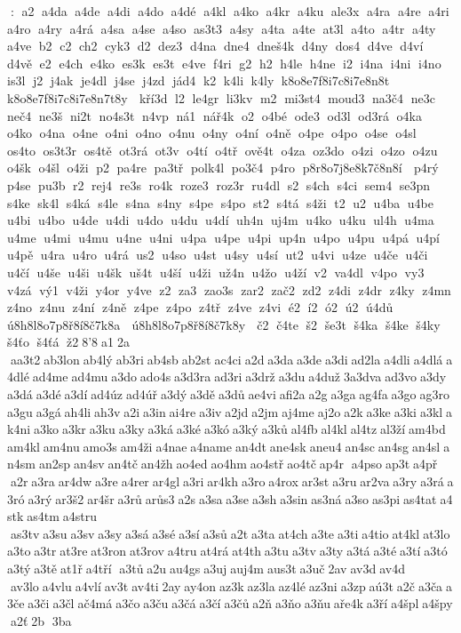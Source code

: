 :  a2  a4da  a4de  a4di  a4do  a4dé  a4kl  a4ko  a4kr  a4ku  ale3x  a4ra  a4re  a4ri  a4ro  a4ry  a4rá  a4sa  a4se  a4so  as3t3  a4sy  a4ta  a4te  at3l  a4to  a4tr  a4ty  a4ve  b2  c2  ch2  cyk3  d2  dez3  d4na  dne4  dneš4k  d4ny  dos4  d4ve  d4ví  d4vě  e2  e4ch  e4ko  es3k  es3t  e4ve  f4ri  g2  h2  h4le  h4ne  i2  i4na  i4ni  i4no  is3l  j2  j4ak  je4dl  j4se  j4zd  jád4  k2  k4li  k4ly  k8o8e7f8i7c8i7e8n8t   k8o8e7f8i7c8i7e8n7t8y   kří3d  l2  le4gr  li3kv  m2  mi3st4  moud3  na3č4  ne3c  neč4  ne3š  ni2t  no4s3t  n4vp  ná1  nář4k  o2  o4bé  ode3  od3l  od3rá  o4ka  o4ko  o4na  o4ne  o4ni  o4no  o4nu  o4ny  o4ní  o4ně  o4pe  o4po  o4se  o4sl  os4to  os3t3r  os4tě  ot3rá  ot3v  o4tí  o4tř  ově4t  o4za  oz3do  o4zi  o4zo  o4zu  o4šk  o4šl  o4ži  p2  pa4re  pa3tř  polk4l  po3č4  p4ro  p8r8o7j8e8k7č8n8í   p4rý  p4se  pu3b  r2  rej4  re3s  ro4k  roze3  roz3r  ru4dl  s2  s4ch  s4ci  sem4  se3pn  s4ke  sk4l  s4ká  s4le  s4na  s4ny  s4pe  s4po  st2  s4tá  s4ži  t2  u2  u4ba  u4be  u4bi  u4bo  u4de  u4di  u4do  u4du  u4dí  uh4n  uj4m  u4ko  u4ku  ul4h  u4ma  u4me  u4mi  u4mu  u4ne  u4ni  u4pa  u4pe  u4pi  up4n  u4po  u4pu  u4pá  u4pí  u4pě  u4ra  u4ro  u4rá  us2  u4so  u4st  u4sy  u4sí  ut2  u4vi  u4ze  u4če  u4či  u4čí  u4še  u4ši  u4šk  uš4t  u4ší  u4ži  už4n  u4žo  u4ží  v2  va4dl  v4po  vy3  v4zá  vý1  v4ži  y4or  y4ve  z2  za3  zao3s  zar2  zač2  zd2  z4di  z4dr  z4ky  z4mn  z4no  z4nu  z4ní  z4ně  z4pe  z4po  z4tř  z4ve  z4vi  é2  í2  ó2  ú2  ú4dů  ú8h8l8o7p8ř8í8č7k8a   ú8h8l8o7p8ř8í8č7k8y   č2  č4te  š2  še3t  š4ka  š4ke  š4ky  š4ťo  š4ťá  ž2 8'8 a1 2a  aa3t2 ab3lon ab4lý ab3ri ab4sb ab2st ac4ci a2d a3da a3de a3di ad2la a4dli a4dlá a4dlé ad4me ad4mu a3do ado4s a3d3ra ad3ri a3drž a3du a4duž 3a3dva ad3vo a3dy a3dá a3dé a3dí ad4úz ad4úř a3dý a3dě a3dů ae4vi afi2a a2g a3ga ag4fa a3go ag3ro a3gu a3gá ah4li ah3v a2i a3in ai4re a3iv a2jd a2jm aj4me aj2o a2k a3ke a3ki a3kl ak4ni a3ko a3kr a3ku a3ky a3ká a3ké a3kó a3ký a3ků al4fb al4kl al4tz al3ží am4bd am4kl am4nu amo3s am4ži a4nae a4name an4dt ane4sk aneu4 an4sc an4sg an4sl an4sm an2sp an4sv an4tč an4žh ao4ed ao4hm ao4stř ao4tč ap4r  a4pso ap3t a4př  a2r a3ra ar4dw a3re a4rer ar4gl a3ri ar4kh a3ro a4rox ar3st a3ru ar2va a3ry a3rá a3ró a3rý ar3š2 ar4šr a3rů arůs3 a2s a3sa a3se a3sh a3sin as3ná a3so as3pi as4tat a4stk as4tm a4stru  as3tv a3su a3sv a3sy a3sá a3sé a3sí a3sů a2t a3ta at4ch a3te a3ti a4tio at4kl at3lo a3to a3tr at3re at3ron at3rov a4tru at4rá at4th a3tu a3tv a3ty a3tá a3té a3tí a3tó a3tý a3tě at1ř a4tří  a3tů a2u au4gs a3uj auj4m aus3t a3uč 2av av3d av4d  av3lo a4vlu a4vlí av3t av4ti 2ay ay4on az3k az3la az4lé az3ni a3zp aú3t a2č a3ča a3če a3či a3čl ač4má a3čo a3ču a3čá a3čí a3čů a2ň a3ňo a3ňu aře4k a3ří a4špl a4špy a2ť 2b  3ba 